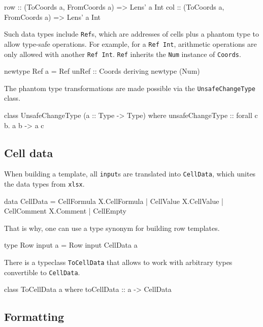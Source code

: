 \begin{mycode}
row :: (ToCoords a, FromCoords a) => Lens' a Int
col :: (ToCoords a, FromCoords a) => Lens' a Int
\end{mycode}

Such data types include \texttt{Ref}s, which are addresses of cells plus a phantom type to allow type-safe operations. For example, for a \texttt{Ref Int}, arithmetic operations are only allowed with another \texttt{Ref Int}. \texttt{Ref} inherits the \texttt{Num} instance of \texttt{Coords}.

\begin{mycode}
newtype Ref a = Ref {unRef :: Coords} deriving newtype (Num)
\end{mycode}

The phantom type transformations are made possible via the \texttt{UnsafeChangeType} class.

\begin{mycode}
class UnsafeChangeType (a :: Type -> Type) where
  unsafeChangeType :: forall c b. a b -> a c
\end{mycode}

\subsection{Cell data}
\label{sec:celldata}

When building a template, all \texttt{input}s are translated into \texttt{CellData}, which unites the data types from \texttt{xlsx}. 

\begin{mycode}
data CellData
  = CellFormula X.CellFormula
  | CellValue X.CellValue
  | CellComment X.Comment
  | CellEmpty
\end{mycode}

That is why, one can use a type synonym for building row templates.

\begin{mycode}
type Row input a = Row input CellData a
\end{mycode}

There is a typeclass \texttt{ToCellData} that allows to work with arbitrary types convertible to \texttt{CellData}.

\begin{mycode}
class ToCellData a where
  toCellData :: a -> CellData
\end{mycode}

\subsection{Formatting}
\label{sec:formatting}

